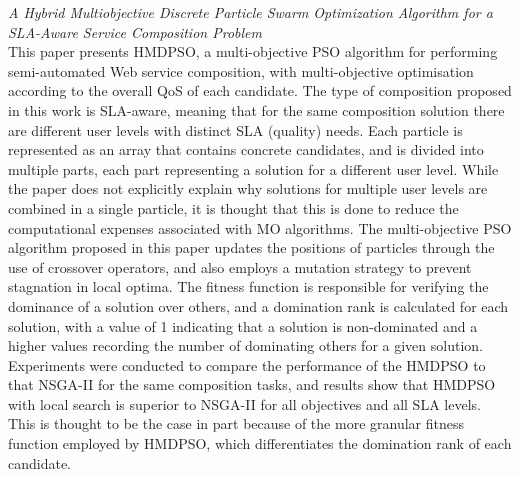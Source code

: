 \textit{A Hybrid Multiobjective Discrete Particle Swarm Optimization Algorithm for a SLA-Aware Service Composition Problem \cite{yin2014hybrid}}\\
This paper presents HMDPSO, a multi-objective PSO algorithm for performing semi-automated Web service composition, with multi-objective optimisation according to the overall QoS of each candidate. The type of composition proposed in this work is SLA-aware, meaning that for the same composition solution there are different user levels with distinct SLA (quality) needs. Each particle is represented as an array that contains concrete candidates, and is divided into multiple parts, each part representing a solution for a different user level. While the paper does not explicitly explain why solutions for multiple user levels are combined in a single particle, it is thought that this is done to reduce the computational
expenses associated with MO algorithms. The multi-objective PSO algorithm proposed in this paper updates the positions of particles through the use of crossover operators, and also
employs a mutation strategy to prevent stagnation in local optima. The fitness function is responsible for verifying the dominance of a solution over others, and a domination rank is
calculated for each solution, with a value of 1 indicating that a solution is non-dominated and a higher values recording the number of dominating others for a given solution. Experiments were conducted to compare the performance of the HMDPSO to that NSGA-II for the same composition tasks, and results show that HMDPSO with local search is superior to NSGA-II for all objectives and all SLA levels. This is thought to be the case in part because of the more granular fitness function employed by HMDPSO, which differentiates the domination rank of each candidate.

